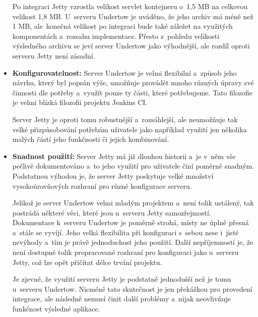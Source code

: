\begin{itemize}
{                    Po integraci Jetty vzrostla velikost servlet kontejneru o~1,5 MB na celkovou
                    velikost 1,8 MB. U~serveru Undertow je uváděno, že jeho archiv má méně
                    než 1 MB, ale~konečná velikost po integraci bude také záležet na využitých komponentách
                    a~rozsahu implementace. Přesto z~pohledu velikosti výsledného archivu
                    se jeví server Undertow jako výhodnější, ale rozdíl oproti serveru Jetty není zásadní.}

                \item{\textbf{Konfigurovatelnost:} Server Undertow je velmi flexibilní a~způsob
                    jeho návrhu, který byl popsán výše, umožňuje provádět mnoho různých úpravy 
                    své činnosti dle potřeby a~využít pouze ty části, které potřebujeme.
                    Tato filozofie je velmi blízká filozofii projektu Jenkins CI. 
                    
                    Server Jetty
                    je oproti tomu robustnější a~rozsáhlejší, ale neumožňuje tak velké přizpůsobování potřebám
                    uživatele jako například využití jen několika malých částí jeho funkčnosti či jejich
                    kombinování. }


                \item{\textbf{Snadnost použití:}}                      
                    Server Jetty má již dlouhou historii a~je v~něm vše pečlivě dokumentováno
                    a~to jeho využití pro uživatele činí poměrně snadným. Podstatnou výhodou je, že
                    server Jetty poskytuje velké množství vysokoúrovňových rozhraní
                    pro různé konfigurace serveru.
                    
                    Jelikož je server Undertow velmi mladým projektem a~není tolik ustálený, 
                    tak postrádá některé věci,
                    které jsou u~serveru Jetty samozřejmostí. 
                    Dokumentace k~serveru
                    Undertow je poměrně strohá, místy ne úplně přesná a~stále se vyvíjí. 
                    Jeho velká flexibilita při konfiguraci s~sebou nese i~jisté nevýhody
                    a~tím je právě jednoduchost jeho použití. Další nepříjemností je, že není
                    dostupné tolik propracované rozhraní pro konfiguraci jako u~serveru Jetty,
                    což lze opět přičítat délce trvání projektu.

                    Je zjevné, že využití serveru Jetty je podstatně jednodušší než je tomu
                    u~serveru Undertow. Nicméně tato skutečnost je jen překážkou pro provedení
                    integrace, ale následně nemusí činit další problémy a~nijak neovlivňuje
                    funkčnost výsledné aplikace.

            \end{itemize}
        

